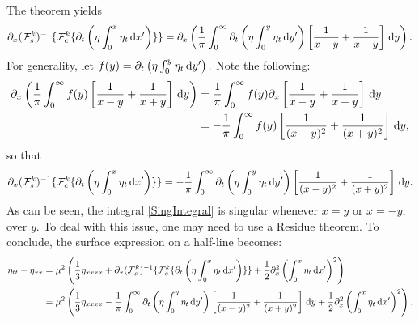 \documentclass[10pt,reqno,oneside,a4paper, landscape]{article}
\begin{document}
The theorem yields 
\[ \partial_x(\mathcal{F}^k_s)^{-1} \{ \mathcal{F}^k_c \{ \partial_t \left( \eta \int^{x}_0\eta_{t} \,\mathrm{d} x' \right)\} \}
= \partial_x \left( \frac{1}{\pi} \int_0^\infty \partial_t \left( \eta \int^{y}_0\eta_{t} \,\mathrm{d} y' \right)  \left[ \frac{1}{x-y} + \frac{1}{x+y} \right] \,\mathrm{d} y \right). \]
For generality, let $f(y) = \partial_t \left( \eta \int^{y}_0\eta_{t} \,\mathrm{d} y' \right).$ Note the following:
\begin{align*} 
\partial_x \left( \frac{1}{\pi} \int_0^\infty f(y) \left[ \frac{1}{x-y} + \frac{1}{x+y} \right] \,\mathrm{d} y \right) &= \frac{1}{\pi} \int_0^\infty f(y) \partial_x \left[ \frac{1}{x-y} + \frac{1}{x+y} \right] \,\mathrm{d} y \\
&= - \frac{1}{\pi} \int_0^\infty f(y)  \left[ \frac{1}{(x-y)^2} + \frac{1}{(x+y)^2} \right] \,\mathrm{d} y,
\end{align*}
so that
\begin{equation}\label{SingIntegral}
\partial_x(\mathcal{F}^k_s)^{-1} \{ \mathcal{F}^k_c \{ \partial_t \left( \eta \int^{x}_0\eta_{t} \,\mathrm{d} x' \right)\} \} = - \frac{1}{\pi} \int_0^\infty \partial_t \left( \eta \int^{y}_0\eta_{t} \,\mathrm{d} y' \right) \left[ \frac{1}{(x-y)^2} + \frac{1}{(x+y)^2} \right] \,\mathrm{d} y.
\end{equation}
As can be seen, the integral \eqref{SingIntegral} is singular whenever $x = y$ or $x = -y,$ over $y.$ To deal with this issue, one may need to use a Residue theorem. To conclude, the surface expression on a half-line becomes:
\begin{align*}
 \eta_{tt} - \eta_{xx} &= \mu^2 \left( \frac{1}{3} \eta_{xxxx}  + \partial_x(\mathcal{F}^k_s)^{-1} \{ \mathcal{F}^k_c \{ \partial_t \left( \eta \int^{x}_0\eta_{t} \,\mathrm{d} x' \right)\} \} + \frac{1}{2} \partial^2_x\left(\int^{x}_0\eta_{t} \,\mathrm{d} x' \right)^2\right) \\
 &= \mu^2 \left( \frac{1}{3} \eta_{xxxx}  - \frac{1}{\pi} \int_0^\infty \partial_t \left( \eta \int^{y}_0\eta_{t} \,\mathrm{d} y' \right) \left[ \frac{1}{(x-y)^2} + \frac{1}{(x+y)^2} \right] \,\mathrm{d} y + \frac{1}{2} \partial^2_x\left(\int^{x}_0\eta_{t} \,\mathrm{d} x' \right)^2\right) . 
\end{align*}
\end{document}
